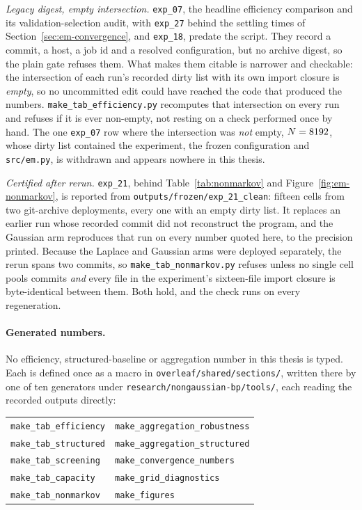 \emph{Legacy digest, empty intersection.} \texttt{exp\_07}, the headline
efficiency comparison and its validation-selection audit, with
\texttt{exp\_27} behind the settling times of
Section~\ref{sec:em-convergence}, and \texttt{exp\_18}, predate the script.
They record a commit, a host, a job id and a resolved configuration, but no
archive digest, so the plain gate refuses them. What makes them citable is
narrower and checkable: the intersection of each run's recorded dirty list with
its own import closure is \emph{empty}, so no uncommitted edit could have
reached the code that produced the numbers.
\texttt{make\_tab\_efficiency.py} recomputes that intersection on every run
and refuses if it is ever non-empty, not resting on a check performed
once by hand. The one \texttt{exp\_07} row where the intersection was
\emph{not} empty, $N = 8192$, whose dirty list contained the
experiment, the frozen configuration and \texttt{src/em.py}, is withdrawn
and appears nowhere in this thesis.

\emph{Certified after rerun.} \texttt{exp\_21}, behind
Table~\ref{tab:nonmarkov} and Figure~\ref{fig:em-nonmarkov}, is reported from
\texttt{outputs/frozen/exp\_21\_clean}: fifteen cells from two git-archive
deployments, every one with an empty dirty list. It replaces an earlier run
whose recorded commit did not reconstruct the program, and the Gaussian arm
reproduces that run on every number quoted here, to the precision printed.
Because the Laplace and Gaussian arms were deployed separately, the rerun spans
two commits, so \texttt{make\_tab\_nonmarkov.py} refuses unless no single cell
pools commits \emph{and} every file in the experiment's sixteen-file import
closure is byte-identical between them. Both hold, and the check runs on every
regeneration.

\paragraph{Generated numbers.} No efficiency, structured-baseline or
aggregation number in this thesis is typed. Each is defined once as a macro in
\texttt{overleaf/shared/sections/}, written there by one of ten generators
under \texttt{research/nongaussian-bp/tools/}, each reading the recorded outputs
directly:

\begin{center}\small
\begin{tabular}{@{}ll@{}}
\texttt{make\_tab\_efficiency} & \texttt{make\_aggregation\_robustness} \\
\texttt{make\_tab\_structured} & \texttt{make\_aggregation\_structured} \\
\texttt{make\_tab\_screening}  & \texttt{make\_convergence\_numbers} \\
\texttt{make\_tab\_capacity}   & \texttt{make\_grid\_diagnostics} \\
\texttt{make\_tab\_nonmarkov}  & \texttt{make\_figures} \\
\end{tabular}
\end{center}

